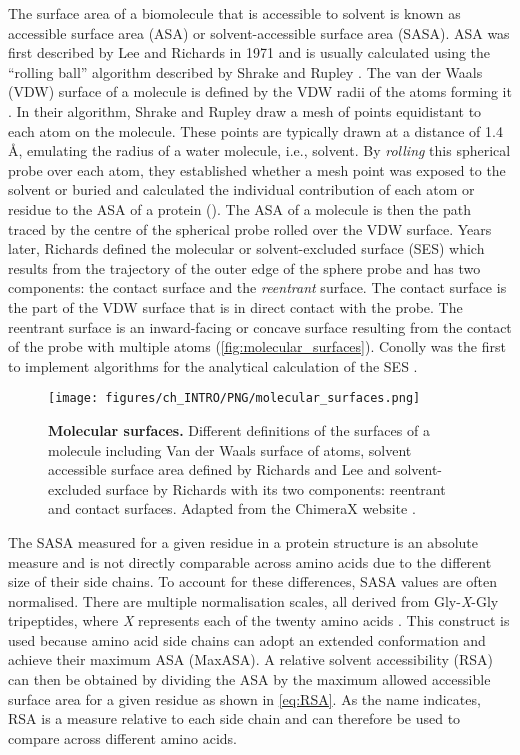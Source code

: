 The surface area of a biomolecule that is accessible to solvent is known as accessible surface area (ASA) or solvent-accessible surface area (SASA). ASA was first described by Lee and Richards in 1971 \cite{LEE_1971_ASA} and is usually calculated using the ``rolling ball'' algorithm described by Shrake and Rupley \cite{SHRAKE_1973_ASA}. The van der Waals (VDW) surface of a molecule is defined by the VDW radii of the atoms forming it \cite{1873_VANDERWAALS_VDW}. In their algorithm, Shrake and Rupley draw a mesh of points equidistant to each atom on the molecule. These points are typically drawn at a distance of 1.4 \AA{}, emulating the radius of a water molecule, i.e., solvent. By \textit{rolling} this spherical probe over each atom, they established whether a mesh point was exposed to the solvent or buried and calculated the individual contribution of each atom or residue to the ASA of a protein (). The ASA of a molecule is then the path traced by the centre of the spherical probe rolled over the VDW surface. Years later, Richards \cite{1977_RICHARDS_SSE} defined the molecular or solvent-excluded surface (SES) which results from the trajectory of the outer edge of the sphere probe and has two components: the contact surface and the \textit{reentrant} surface. The contact surface is the part of the VDW surface that is in direct contact with the probe. The reentrant surface is an inward-facing or concave surface resulting from the contact of the probe with multiple atoms (\autoref{fig:molecular_surfaces}). Conolly was the first to implement algorithms for the analytical calculation of the SES \cite{1983_CONNOLLY_SASA, 1983_CONNOLLY_SASA2}.

\begin{figure}[htb!]
    \centering
    \texttt{[image: figures/ch\_INTRO/PNG/molecular\_surfaces.png]}
    \caption[Molecular surfaces]{\textbf{Molecular surfaces.} Different definitions of the surfaces of a molecule including Van der Waals surface of atoms, solvent accessible surface area defined by Richards and Lee and solvent-excluded surface by Richards with its two components: reentrant and contact surfaces. Adapted from the ChimeraX website \cite{surface_diagram}.}
    \label{fig:molecular_surfaces}
\end{figure}

The SASA measured for a given residue in a protein structure is an absolute measure and is not directly comparable across amino acids due to the different size of their side chains. To account for these differences, SASA values are often normalised. There are multiple normalisation scales, all derived from Gly-\textit{X}-Gly tripeptides, where \textit{X} represents each of the twenty amino acids \cite{1985_ROSE_MAXASA, MILLER_1987_MAXASA, TIEN_2013_RSA}. This construct is used because amino acid side chains can adopt an extended conformation and achieve their maximum ASA (MaxASA). A relative solvent accessibility (RSA) can then be obtained by dividing the ASA by the maximum allowed accessible surface area for a given residue as shown in \autoref{eq:RSA}. As the name indicates, RSA is a measure relative to each side chain and can therefore be used to compare across different amino acids.

